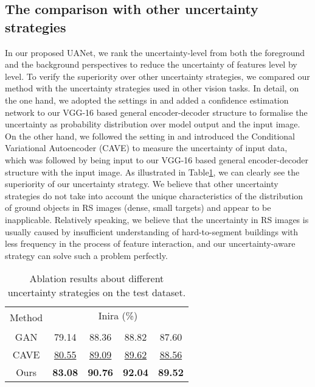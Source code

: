 \documentclass[lettersize,journal]{IEEEtran}
\begin{document}
\subsection{The comparison with other uncertainty strategies}
In our proposed UANet, we rank the uncertainty-level from both the foreground and the background perspectives to reduce the uncertainty of features level by level. To verify the superiority over other uncertainty strategies, we compared our method with the uncertainty strategies used in other vision tasks. In detail, on the one hand, we adopted the settings in \cite{aleatoric_uncertainty} and added a confidence estimation network to our VGG-16 based general encoder-decoder structure to formalise the uncertainty as probability distribution over model output and the input image. On the other hand, we followed the setting in \cite{CVAE_COD} and introduced the Conditional Variational Autoencoder (CAVE) to measure the uncertainty of input data, which was followed by being input to our VGG-16 based general encoder-decoder structure with the input image. As illustrated in Table\ref{tab:table_us}, we can clearly see the superiority of our uncertainty strategy. We believe that other uncertainty strategies do not take into account the unique characteristics of the distribution of ground objects in RS images (dense, small targets) and appear to be inapplicable. Relatively speaking, we believe that the uncertainty in RS images is usually caused by insufficient understanding of hard-to-segment buildings with less frequency in the process of feature interaction, and our uncertainty-aware strategy can solve such a problem perfectly.






\begin{table}[]
\normalsize
\setlength\tabcolsep{3pt}
\caption{Ablation results about different uncertainty strategies on the test dataset.}
\label{tab:table_us}
\center
\begin{tabular}{c|cccc}
\hline
\multirow{2}{*}{Method} &\multicolumn{4}{c}{Inira (\%)}                                             
 \\ \cline{2-5} 
 &  &  &  &  \\ \hline
GAN&
79.14	&88.36	&88.82	&87.60\\ 
CAVE &
\underline{80.55}	&\underline{89.09}	&\underline{89.62}	&\underline{88.56}\\ 
Ours &
\color{red}\textbf{83.08}  &\color{red}\textbf{90.76} &\color{red}\textbf{92.04} &\color{red}\textbf{89.52}
\\ \hline
\end{tabular}
\end{table}
\end{document}
